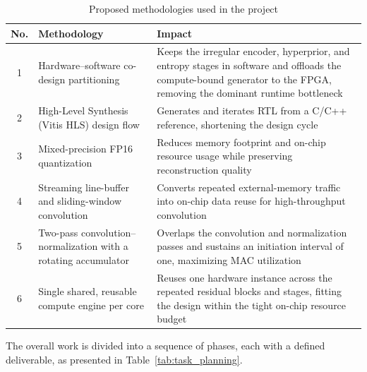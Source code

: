 \begin{table}[H]
\centering
\caption{Proposed methodologies used in the project}
\label{tab:methodologies}
\renewcommand{\arraystretch}{1.3}
\begin{tabularx}{\textwidth}{|c|>{\raggedright\arraybackslash}p{}|X|}
\hline
\textbf{No.} & \textbf{Methodology} & \textbf{Impact} \\
\hline
1 & Hardware--software co-design partitioning & Keeps the irregular encoder, hyperprior, and entropy stages in software and offloads the compute-bound generator to the FPGA, removing the dominant runtime bottleneck \\
\hline
2 & High-Level Synthesis (Vitis HLS) design flow & Generates and iterates RTL from a C/C++ reference, shortening the design cycle \\
\hline
3 & Mixed-precision FP16 quantization & Reduces memory footprint and on-chip resource usage while preserving reconstruction quality \\
\hline
4 & Streaming line-buffer and sliding-window convolution & Converts repeated external-memory traffic into on-chip data reuse for high-throughput convolution \\
\hline
5 & Two-pass convolution--normalization with a rotating accumulator & Overlaps the convolution and normalization passes and sustains an initiation interval of one, maximizing MAC utilization \\
\hline
6 & Single shared, reusable compute engine per core & Reuses one hardware instance across the repeated residual blocks and stages, fitting the design within the tight on-chip resource budget \\
\hline
\end{tabularx}
\end{table}

The overall work is divided into a sequence of phases, each with a defined deliverable, as presented in Table~\ref{tab:task_planning}.

